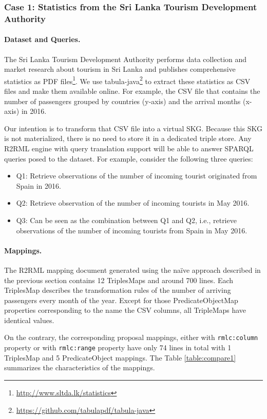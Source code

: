 \subsubsection{Case 1: Statistics from the Sri Lanka Tourism Development Authority}
\noindent\paragraph{Dataset and Queries.}
The Sri Lanka Tourism Development Authority performs data collection and market research about tourism in Sri Lanka and publishes comprehensive statistics as PDF files\footnote{\url{http://www.sltda.lk/statistics}}. We use tabula-java\footnote{\url{https://github.com/tabulapdf/tabula-java}} to extract these statistics as CSV files and make them available online. For example, the CSV file that contains the number of passengers grouped by countries (y-axis) and the arrival months (x-axis) in 2016.

Our intention is to transform that CSV file into a virtual SKG. Because this SKG is not materialized, there is no need to store it in a dedicated triple store. Any R2RML engine with query translation support will be able to answer SPARQL queries posed to the dataset. For example, consider the following three queries:
\begin{itemize}
\item Q1: Retrieve observations of the number of incoming tourist originated from Spain in 2016.
\item Q2: Retrieve observation of the number of incoming tourists in May 2016.
\item Q3: Can be seen as the combination between Q1 and Q2, i.e., retrieve observations of the number of incoming tourists from Spain in May 2016. 
\end{itemize}

\noindent\paragraph{Mappings.}
The R2RML mapping document generated using the na\"ive approach described in the previous section contains 12 TriplesMaps and around 700 lines. Each TriplesMap describes the transformation rules of the number of arriving passengers every month of the year. Except for those PredicateObjectMap properties corresponding to the name the CSV columns, all TripleMaps have identical values. 

On the contrary, the corresponding proposal mappings, either with \texttt{rmlc:column} property or with \texttt{rmlc:range} property have only 74 lines in total with 1 TriplesMap and 5 PredicateObject mappings. The Table \ref{table:compare1} summarizes the characteristics of the mappings.

